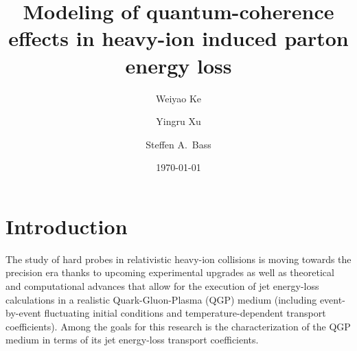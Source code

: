\documentclass[aps, prc, reprint, amsmath, groupedaddress, nofootinbib]{revtex4-1}
\begin{document}
\title{Modeling of quantum-coherence effects in heavy-ion induced parton energy loss}
\author{Weiyao Ke}
\author{Yingru Xu}
\author{Steffen A.\ Bass}
\date{\today}
\maketitle 

\section{Introduction}
The study of hard probes in relativistic heavy-ion collisions is moving towards the precision era thanks to upcoming experimental upgrades \cite{ATLAS-Collaboration:2012iwa,Abelevetal:2014dna,STAR:upgrade-hf,Adare:2015kwa,CMS:2017dec} as well as theoretical and computational advances that allow for the execution of jet energy-loss calculations in a realistic Quark-Gluon-Plasma (QGP) medium (including event-by-event fluctuating initial conditions and temperature-dependent transport coefficients). Among the goals for this research is the characterization of the QGP medium in terms of its jet energy-loss transport coefficients.
\end{document}
